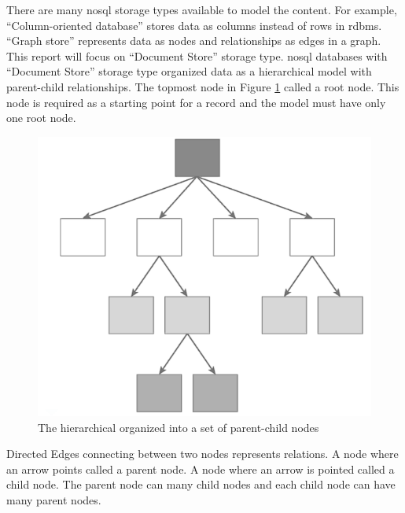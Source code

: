 There are many \gls{nosql} storage types available to model the content.
For example, \enquote{Column-oriented database} stores data as columns instead of rows in \gls{rdbms}.
\enquote{Graph store} represents data as nodes and relationships as edges in a graph.
This report will focus on \enquote{Document Store} storage type.
\gls{nosql} databases with \enquote{Document Store} storage type organized data as a hierarchical model with parent-child relationships.
The topmost node in Figure \ref{arch-node} called a root node.
This node is required as a starting point for a record and the model must have only one root node.
\begin{figure}[h]
	\centering
	\includegraphics[scale=0.48]{res/bg-knowledge/nosql-hierarchical}
	\caption{The hierarchical organized into a set of parent-child nodes }
	\label{arch-node}
\end{figure}
Directed Edges connecting between two nodes represents relations.
A node where an arrow points called a parent node.
A node where an arrow is pointed called a child node.
The parent node can many child nodes and each child node can have many parent nodes.

